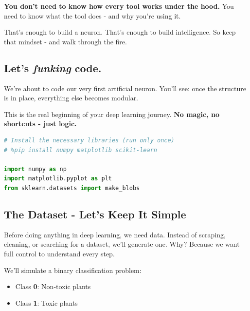 \documentclass[11pt]{article}
\begin{document}
\begin{tcolorbox}[colback=gray!5, colframe=gray!60!black]
\textbf{You don't need to know how every tool works under the hood.}  
You need to know what the tool does - and why you're using it.
\end{tcolorbox}

That's enough to build a neuron. That's enough to build intelligence.  
So keep that mindset - and walk through the fire.


\subsection*{Let's \textit{funking} code.}

\begin{tcolorbox}[colback=gray!3, colframe=black!40, title=Let's build our first neuron, fonttitle=\bfseries, arc=2mm]
We're about to code our very first artificial neuron.  
You'll see: once the structure is in place, everything else becomes modular.

This is the real beginning of your deep learning journey.  
\textbf{No magic, no shortcuts - just logic.}
\end{tcolorbox}

\vspace{1em}

\begin{lstlisting}[language=Python]
# Install the necessary libraries (run only once)
# %pip install numpy matplotlib scikit-learn

import numpy as np
import matplotlib.pyplot as plt
from sklearn.datasets import make_blobs
\end{lstlisting}

\subsection*{The Dataset - Let's Keep It Simple}

\vspace{0.5em}

Before doing anything in deep learning, we need data.  
Instead of scraping, cleaning, or searching for a dataset, we'll generate one. Why? Because we want full control to understand every step.

\medskip

We'll simulate a binary classification problem:
\begin{itemize}
    \item Class \textbf{0}: Non-toxic plants
    \item Class \textbf{1}: Toxic plants
\end{itemize}
\end{document}
